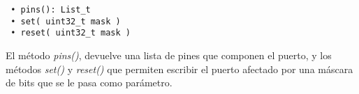 \begin{verbatim}
 • pins(): List_t
 • set( uint32_t mask )
 • reset( uint32_t mask )
\end{verbatim}

El método \emph{pins()}, devuelve una lista de pines que componen el puerto, y los métodos \emph{set()} y \emph{reset()} que permiten escribir el puerto afectado por una máscara de bits que se le pasa como parámetro.






